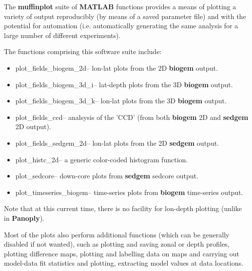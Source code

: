 \documentclass[11pt,fleqn]{book} %
\begin{document}
\noindent The \textbf{muffinplot} suite of \textbf{MATLAB} functions provides a means of plotting a variety of output reproducibly (by means of  a saved parameter file) and with the potential for automation (i.e. automatically generating the same analysis for a large number of different experiments).

The functions comprising this software suite include:

\begin{itemize}[noitemsep]
\vspace{1mm}
\item \footnotesize\textsf{plot\_fields\_biogem\_2d}\normalsize -- lon-lat plots from the 2D \textbf{biogem} output.
\vspace{1mm}
\item \footnotesize\textsf{plot\_fields\_biogem\_3d\_i}\normalsize -- lat-depth plots from the 3D \textbf{biogem} output.
\vspace{1mm}
\item \footnotesize\textsf{plot\_fields\_biogem\_3d\_k}\normalsize -- lon-lat plots from the 3D \textbf{biogem} output.
\vspace{1mm}
\item \footnotesize\textsf{plot\_fields\_ccd}\normalsize -- analsysis of the 'CCD' (from both \textbf{biogem} 2D and \textbf{sedgem} 2D output).
\vspace{1mm}
\item \footnotesize\textsf{plot\_fields\_sedgem\_2d}\normalsize -- lon-lat plots from the 2D \textbf{sedgem} output.
\vspace{1mm}
\item \footnotesize\textsf{plot\_histc\_2d}\normalsize -- a generic color-coded histogram function.
\vspace{1mm}
\item \footnotesize\textsf{plot\_sedcore}\normalsize -- down-core plots from \textbf{sedgem} sedcore output.
\vspace{1mm}
\item \footnotesize\textsf{plot\_timeseries\_biogem}\normalsize -- time-series plots from \textbf{biogem} time-series output.
\end{itemize}
Note that at this current time, there is no facility for lon-depth plotting (unlike in \textbf{Panoply}).

Most of the plots also perform additional functions (which can be generally disabled if not wanted), such as plotting and saving zonal or depth profiles, plotting difference maps, plotting and labelling data on maps and carrying out model-data fit statistics and plotting, extracting model values at data locations.
\end{document}
